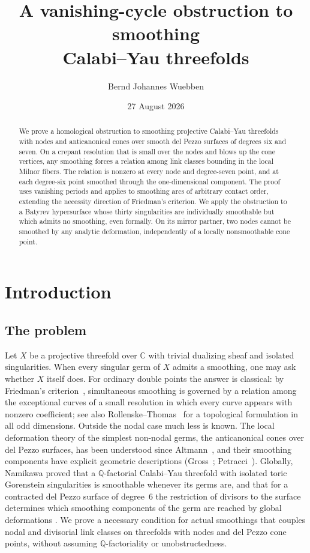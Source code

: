 \documentclass[11pt]{amsart}
\title[A vanishing-cycle smoothing obstruction]{A vanishing-cycle
obstruction to smoothing\\ Calabi--Yau threefolds}
\author{Bernd Johannes Wuebben}
\date{27 August 2026}
\theoremstyle{definition}
\theoremstyle{remark}
\theoremstyle{plain}
\newcommand{\QQ}{\mathbb{Q}}
\newcommand{\CC}{\mathbb{C}}
\begin{document}
\begin{abstract}
We prove a homological obstruction to smoothing projective Calabi--Yau
threefolds with nodes and anticanonical cones over smooth del Pezzo surfaces
of degrees six and seven. On a crepant resolution that is small over the
nodes and blows up the cone vertices, any smoothing forces a relation among
link classes bounding in the local Milnor fibers. The relation is nonzero
at every node and degree-seven point, and at each degree-six point smoothed
through the one-dimensional component. The proof uses vanishing periods
and applies to smoothing arcs of arbitrary contact order, extending the
necessity direction of Friedman's criterion. We apply the obstruction to a
Batyrev hypersurface whose thirty singularities are individually smoothable
but which admits no smoothing, even formally. On its mirror partner, two
nodes cannot be smoothed by any analytic deformation, independently of a
locally nonsmoothable cone point.
\end{abstract}

\maketitle

\section{Introduction}\label{sec:intro}

\subsection{The problem}
Let $X$ be a projective threefold over $\CC$ with trivial dualizing
sheaf and isolated singularities.  When every singular germ of $X$
admits a smoothing, one may ask whether $X$ itself does.  For ordinary
double points the answer is classical: by Friedman's
criterion~\cite{Friedman86}, simultaneous smoothing is governed by a
relation among the exceptional curves of a small resolution in which
every curve appears with nonzero coefficient; see also
Rollenske--Thomas~\cite{RT09} for a topological formulation in all odd
dimensions.  Outside the nodal case much less is known.  The local
deformation theory of the simplest non-nodal germs, the
anticanonical cones over del Pezzo surfaces, has been understood
since Altmann~\cite{Altmann95,Altmann97}, and their smoothing
components have explicit geometric descriptions
(Gross~\cite[\S5.5]{Gross97}; Petracci~\cite{Petracci20,Petracci19}).
Globally, Namikawa proved that a $\QQ$-factorial Calabi--Yau threefold with
isolated toric Gorenstein singularities is smoothable whenever its germs are,
and that for a contracted del Pezzo surface of degree~$6$ the restriction of
divisors to the surface determines which smoothing components of the germ are
reached by global deformations \cite{Namikawa97}.  We prove a necessary
condition for actual smoothings that couples nodal and divisorial link
classes on threefolds with nodes and del Pezzo cone points, without
assuming $\QQ$-factoriality or unobstructedness.
\end{document}
